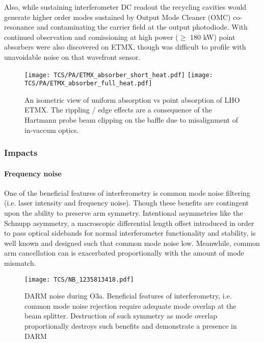 Also, while sustaining interferometer DC readout the recycling cavities would generate higher order modes sustained by Output Mode Cleaner (OMC) co-resonance and contaminating the carrier field at the output photodiode. With continued observation and comissioning at high power ($\geq$ 180 kW) point absorbers were also discovered on ETMX, though was difficult to profile with unavoidable noise on that wavefront sensor.

\begin{figure}[H]
  \centering
  \begin{subcaptiongroup}
	  \texttt{[image: TCS/PA/ETMX\_absorber\_short\_heat.pdf]}
	  \label{subfig:etmxpajustself}
	  \texttt{[image: TCS/PA/ETMX\_absorber\_full\_heat.pdf]}
	  \label{subfig:etmxpaselfplusabs}
  \end{subcaptiongroup}
  \captionsetup{subrefformat=parens}
  \vspace{-19mm}
  \caption{An isometric view of uniform absorption vs point absorption of LHO ETMX. The rippling / edge effects are a consequence of the Hartmann probe beam clipping on the baffle due to misalignment of in-vaccum optics.}
  \label{fig:ETMXpabs}
\end{figure}

\subsubsection{Impacts}
\paragraph{Frequency noise}
One of the beneficial features of interferometry is common mode noise filtering (i.e. laser intensity and frequency noise). Though these benefits are contingent upon the ability to preserve arm symmetry. Intentional asymmetries like the Schnupp asymmetry, a macroscopic differential length offset introduced in order to pass optical sidebands for normal interferometer functionality and stability, is well known and designed such that common mode noise low. Meanwhile, common arm cancellation can is exacerbated proportionally with the amount of mode mismatch.

\begin{figure}[H]
    \texttt{[image: TCS/NB\_1235813418.pdf]}
    \caption{DARM noise during O3a. Beneficial features of interferometry, i.e. common mode noise rejection require adequate mode overlap at the beam splitter. Destruction of such symmetry as mode overlap proportionally destroys such benefits and demonstrate a presence in DARM}    
    \label{fig:high_freqnoise}
\end{figure}

